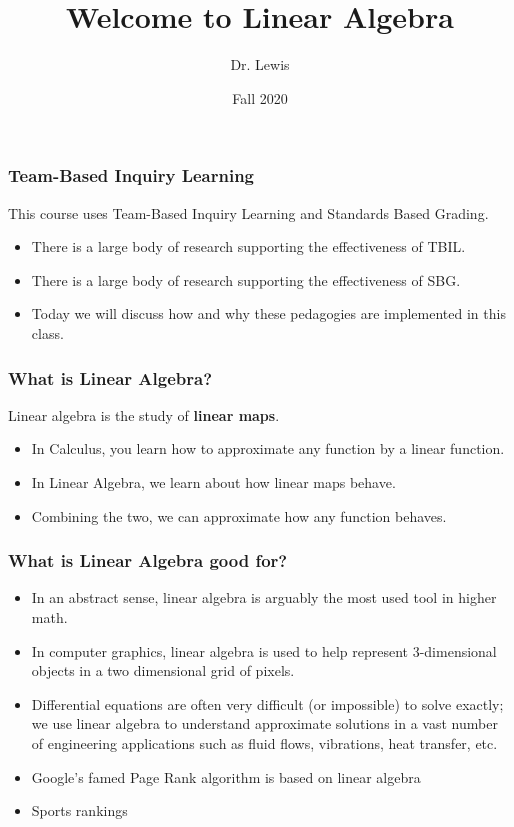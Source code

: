 \documentclass[aspectration=1610]{beamer}
\title{Welcome to Linear Algebra}
\author{Dr. Lewis}
\date{Fall 2020}
\begin{document}
\begin{frame}
\titlepage
\end{frame}

\begin{frame}\frametitle{Team-Based Inquiry Learning}
This course uses Team-Based Inquiry Learning and Standards Based Grading.
\begin{itemize}
	\item There is a large body of research supporting the effectiveness of TBIL.
	\item There is a large body of research supporting the effectiveness of SBG.
	\item Today we will discuss how and why these pedagogies are implemented in this class.
\end{itemize}
  
\end{frame}
 



\begin{frame} \frametitle{What is Linear Algebra? }
Linear algebra is the study of {\bf linear maps}.
\begin{itemize}
\item In Calculus, you learn how to approximate any function by a linear function.
\item In Linear Algebra, we learn about how linear maps behave.
\item Combining the two, we can approximate how any function behaves.
\end{itemize}
\end{frame}

\begin{frame} \frametitle{What is Linear Algebra good for?}
\begin{itemize}
\item In an abstract sense, linear algebra is arguably the most used tool in higher math.
\item In computer graphics, linear algebra is used to help represent 3-dimensional objects in a two dimensional grid of pixels.
\item Differential equations are often very difficult (or impossible) to solve exactly; we use linear algebra to understand approximate solutions in a vast number of engineering applications such as fluid flows, vibrations, heat transfer, etc.
\item Google's famed Page Rank algorithm is based on linear algebra
\item Sports rankings 
\end{itemize}
\end{frame}
\end{document}
